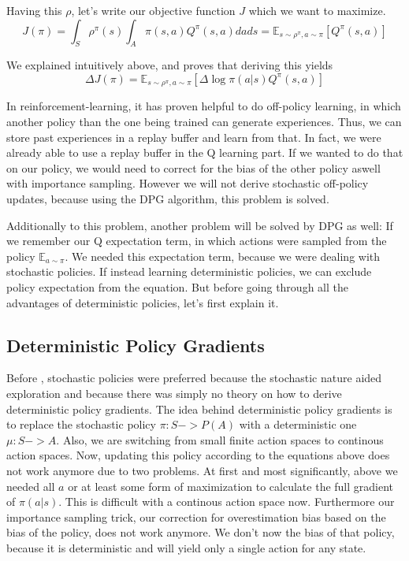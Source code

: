 \documentclass[hyperref,german,beleg]{cgvpub}
\begin{document}
Having this $\rho$, let's write our objective function $J$ which we want to maximize.
\begin{equation}
J(\pi) = \int_S \rho^{\pi}(s) \int_A \pi(s, a)Q^{\pi}(s, a) dads = \mathbb{E}_{s \sim \rho^{\pi}, a \sim \pi}[Q^{\pi}(s,a)]
\end{equation}

We explained intuitively above, and \cite{suttonPolicyGradientMethods} proves that deriving this yields
\begin{equation}
\Delta J(\pi) = \mathbb{E}_{s \sim \rho^{\pi}, a \sim \pi}[\Delta \log \pi(a|s)Q^{\pi}(s, a)]
\end{equation}


In reinforcement-learning, it has proven helpful to do off-policy learning, in which another policy than the one being trained can generate experiences. Thus, we can store past experiences in a replay buffer and learn from that. In fact, we were already able to use a replay buffer in the Q learning part. If we wanted to do that on our policy, we would need to correct for the bias of the other policy aswell with importance sampling. However we will not derive stochastic off-policy updates, because using the \ac{DPG} algorithm, this problem is solved.

Additionally to this problem, another problem will be solved by \ac{DPG} as well: If we remember our Q expectation term, in which actions were sampled from the policy $\mathbb{E}_{a \sim \pi}$. We needed this expectation term, because we were dealing with stochastic policies. If instead learning deterministic policies, we can exclude policy expectation from the equation. But before going through all the advantages of deterministic policies, let's first explain it.

\subsection{Deterministic Policy Gradients}

Before \cite{silverDeterministicPolicyGradient2013}, stochastic policies were preferred because the stochastic nature aided exploration and because there was simply no theory on how to derive deterministic policy gradients. The idea behind deterministic policy gradients is to replace the stochastic policy $\pi: S -> P(A)$ with a deterministic one $\mu: S -> A$. Also, we are switching from small finite action spaces to continous action spaces. Now, updating this policy according to the equations above does not work anymore due to two problems. At first and most significantly, above we needed all $a$ or at least some form of maximization to calculate the full gradient of $\pi(a|s)$. This is difficult with a continous action space now. Furthermore our importance sampling trick, our correction for overestimation bias based on the bias of the policy, does not work anymore. We don't now the bias of that policy, because it is deterministic and will yield only a single action for any state. 
\end{document}
